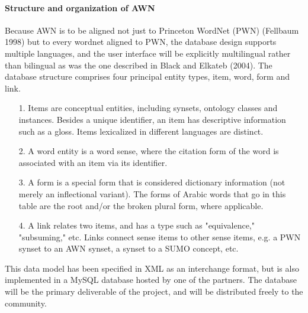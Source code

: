 \paragraph{Structure and organization of AWN}
Because AWN is to be aligned not just to Princeton WordNet (PWN) (Fellbaum 1998) but to every wordnet aligned to PWN, the database design supports multiple languages, and the user interface will be explicitly multilingual rather than bilingual as was the one described in Black and Elkateb (2004)\citep{awn_1}.
The database structure comprises four principal entity types, item, word, form and link.
\begin{itemize}
\item [1.] Items are conceptual entities, including synsets, ontology classes and instances. Besides a unique identifier, an item has descriptive information such as a gloss. Items lexicalized in different languages are distinct.
\item [2.]A word entity is a word sense, where the citation form of the word is associated with an item via its identifier.
\item [3.]A form is a special form that is considered dictionary information (not merely an inflectional variant). The forms of Arabic words that go in this table are the root and/or the broken plural form, where applicable.
\item [4.]A link relates two items, and has a type such as "equivalence," "subsuming," etc. Links connect sense items to other sense items, e.g. a PWN synset to an AWN synset, a synset to a SUMO concept, etc.
\end{itemize}
This data model has been specified in XML as an interchange format, but is also implemented in a MySQL database hosted by one of the partners. The database will be the primary deliverable of the project, and will be distributed freely to the community.

